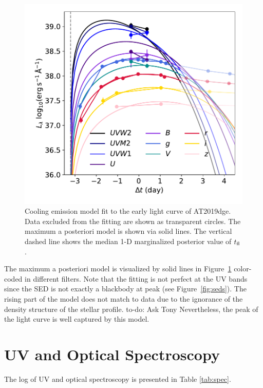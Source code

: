 \documentclass[twocolumn]{aastex63}
\newcommand{\todo}[1]{{\color{magenta} to-do: {#1}}}
\begin{document}
\begin{CJK*}{UTF8}{gbsn}
\begin{figure}[htbp!]
	\centering
	\includegraphics[width=\columnwidth]{figures/P15model.pdf}
	\caption{Cooling emission model fit to the early light curve of AT2019dge. 
		Data excluded from the fitting are shown as transparent circles. 
		The maximum a posteriori model is shown via solid lines.
		The vertical dashed line shows the median 1-D marginalized posterior value of
		$t_{\rm fl}$.
		\label{fig:piromodel}}
\end{figure}

The maximum a posteriori model is visualized by solid lines in Figure~\ref{fig:piromodel} color-coded in 
different filters. Note that the fitting is not perfect at the UV bands since 
the SED is not exactly a blackbody at peak (see Figure~\ref{fig:seds}). The rising part of the model 
does not match to data due to the ignorance of the density structure of the stellar profile. \todo{Ask 
Tony} Nevertheless, the peak of the light curve is well captured by this model.


\section{UV and Optical Spectroscopy} \label{app:spec}
The log of UV and optical spectroscopy is presented in Table \ref{tab:spec}.


\end{CJK*}
\end{document}
